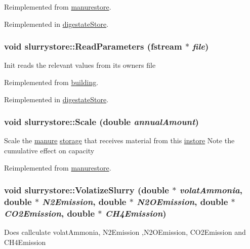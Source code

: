 Reimplemented from \hyperlink{classmanurestore_ab32685c2f4be9bb58269655cab7c96ee}{manurestore}.

Reimplemented in \hyperlink{classdigestate_store_a840cf55a8a893f089c8c39a36cc3defe}{digestateStore}.\hypertarget{classslurrystore_a20975780b58214d7a091cbc2573c910c}{
\subsubsection[{ReadParameters}]{\setlength{\rightskip}{0pt plus 5cm}void slurrystore::ReadParameters (fstream $\ast$ {\em file})}}
\label{classslurrystore_a20975780b58214d7a091cbc2573c910c}
Init reads the relevant values from its owners file 

Reimplemented from \hyperlink{classbuilding_a5649b5598b63c3a4cf7a4e6e7d452d5d}{building}.

Reimplemented in \hyperlink{classdigestate_store_a93cdf55c94956f5e817ad386ea0c2a4b}{digestateStore}.\hypertarget{classslurrystore_a72711544587a5024eeaa072c43a4840a}{
\subsubsection[{Scale}]{\setlength{\rightskip}{0pt plus 5cm}void slurrystore::Scale (double {\em annualAmount})}}
\label{classslurrystore_a72711544587a5024eeaa072c43a4840a}
Scale the \hyperlink{classmanure}{manure} \hyperlink{classstorage}{storage} that receives material from this \hyperlink{classinstore}{instore} Note the cumulative effect on capacity 

Reimplemented from \hyperlink{classmanurestore_a1efaaee1df384e1eb1705c104d8567c7}{manurestore}.\hypertarget{classslurrystore_a6142751bab2ade200478ce49cc21dc2d}{
\subsubsection[{VolatizeSlurry}]{\setlength{\rightskip}{0pt plus 5cm}void slurrystore::VolatizeSlurry (double $\ast$ {\em volatAmmonia}, \/  double $\ast$ {\em N2Emission}, \/  double $\ast$ {\em N2OEmission}, \/  double $\ast$ {\em CO2Emission}, \/  double $\ast$ {\em CH4Emission})}}
\label{classslurrystore_a6142751bab2ade200478ce49cc21dc2d}
Does callculate volatAmmonia, N2Emission ,N2OEmission, CO2Emission and CH4Emission 

